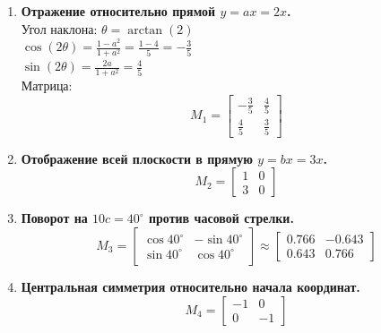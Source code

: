 \begin{enumerate}
  \item \textbf{Отражение относительно прямой $y = ax = 2x$.}\\
  Угол наклона: $\theta = \arctan(2)$\\
  $\cos(2\theta) = \frac{1 - a^2}{1 + a^2} = \frac{1 - 4}{5} = -\frac{3}{5}$\\
  $\sin(2\theta) = \frac{2a}{1 + a^2} = \frac{4}{5}$\\
  Матрица:
  \[
    M_1 = \begin{bmatrix}
      -\frac{3}{5} & \frac{4}{5} \\
      \frac{4}{5} & \frac{3}{5}
    \end{bmatrix}
  \]

  \item \textbf{Отображение всей плоскости в прямую $y = bx = 3x$.}\\
  \[
    M_2 = \begin{bmatrix}
      1 & 0 \\
      3 & 0
    \end{bmatrix}
  \]

  \item \textbf{Поворот на $10c = 40^\circ$ против часовой стрелки.}\\
  \[
    M_3 = \begin{bmatrix}
      \cos 40^\circ & -\sin 40^\circ \\
      \sin 40^\circ & \cos 40^\circ
    \end{bmatrix} \approx
    \begin{bmatrix}
      0.766 & -0.643 \\
      0.643 & 0.766
    \end{bmatrix}
  \]

  \item \textbf{Центральная симметрия относительно начала координат.}\\
  \[
    M_4 = \begin{bmatrix}
      -1 & 0 \\
      0 & -1
    \end{bmatrix}
  \]


\end{enumerate}
